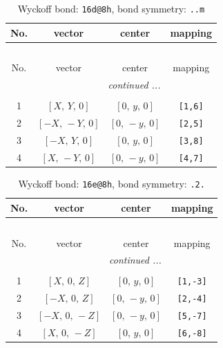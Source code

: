 \documentclass[fleqn,8pt]{jsarticle}
\begin{document}
\begin{longtable}{cccc}
\caption{Wyckoff bond: {\tt 16d@8h}, bond symmetry: {\tt ..m}}
 \\
 \hline \hline
No. & vector & center & mapping \\ \hline \endfirsthead

\multicolumn{3}{l}{\tablename\ \thetable{}} \\
 \hline \hline
No. & vector & center & mapping \\ \hline \endhead

 \hline \hline
\multicolumn{3}{r}{\footnotesize\it continued ...} \\ \endfoot

 \hline \hline
\multicolumn{3}{r}{} \\ \endlastfoot

1 & $\left[ X,\, Y,\, 0 \right]$ & $\left[ 0,\, y,\, 0 \right]$ & {\tt [1,6]} \\ \hline
2 & $\left[ - X,\, - Y,\, 0 \right]$ & $\left[ 0,\, - y,\, 0 \right]$ & {\tt [2,5]} \\ \hline
3 & $\left[ - X,\, Y,\, 0 \right]$ & $\left[ 0,\, y,\, 0 \right]$ & {\tt [3,8]} \\ \hline
4 & $\left[ X,\, - Y,\, 0 \right]$ & $\left[ 0,\, - y,\, 0 \right]$ & {\tt [4,7]} \\
\end{longtable}
\renewcommand{\arraystretch}{1.2}
\begin{longtable}{cccc}
\caption{Wyckoff bond: {\tt 16e@8h}, bond symmetry: {\tt .2.}}
 \\
 \hline \hline
No. & vector & center & mapping \\ \hline \endfirsthead

\multicolumn{3}{l}{\tablename\ \thetable{}} \\
 \hline \hline
No. & vector & center & mapping \\ \hline \endhead

 \hline \hline
\multicolumn{3}{r}{\footnotesize\it continued ...} \\ \endfoot

 \hline \hline
\multicolumn{3}{r}{} \\ \endlastfoot

1 & $\left[ X,\, 0,\, Z \right]$ & $\left[ 0,\, y,\, 0 \right]$ & {\tt [1,-3]} \\ \hline
2 & $\left[ - X,\, 0,\, Z \right]$ & $\left[ 0,\, - y,\, 0 \right]$ & {\tt [2,-4]} \\ \hline
3 & $\left[ - X,\, 0,\, - Z \right]$ & $\left[ 0,\, - y,\, 0 \right]$ & {\tt [5,-7]} \\ \hline
4 & $\left[ X,\, 0,\, - Z \right]$ & $\left[ 0,\, y,\, 0 \right]$ & {\tt [6,-8]} \\
\end{longtable}
\end{document}
